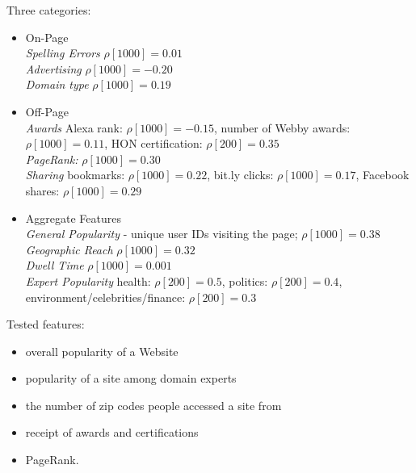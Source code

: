 \documentclass{article}
\begin{document}
Three categories:

\begin{itemize}
\item On-Page 
\\
\textit{Spelling Errors} $\rho[1000] = 0.01$
\\
\textit{Advertising} $\rho[1000] = -0.20$
\\
\textit{Domain type} $\rho[1000] = 0.19$

\item Off-Page
\\
\textit{Awards} Alexa rank: $\rho[1000]=-0.15$, number of Webby awards: $\rho[1000]=0.11$, HON certification: $\rho[200]=0.35$
\\
\textit{PageRank:} $\rho[1000] = 0.30$
\\
\textit{Sharing} bookmarks: $\rho[1000]=0.22$, bit.ly clicks: $\rho[1000]=0.17$, Facebook shares:
$\rho[1000]=0.29$

\item Aggregate Features
\\
\textit{General Popularity} - unique user IDs visiting the page; $\rho[1000] = 0.38$
\\
\textit{Geographic Reach} $\rho[1000] = 0.32$
\\
\textit{Dwell Time} $\rho[1000] = 0.001$
\\
\textit{Expert Popularity}  health: $\rho[200]=0.5$, politics: $\rho[200]=0.4$, environment/celebrities/finance: $\rho[200]=0.3$
\end{itemize}

Tested features:
\begin{itemize}
\item overall popularity of a Website
\item popularity of a site among domain experts
\item the number of zip codes people accessed a site from
\item receipt of awards and certifications
\item PageRank.
\end{itemize}
\end{document}
